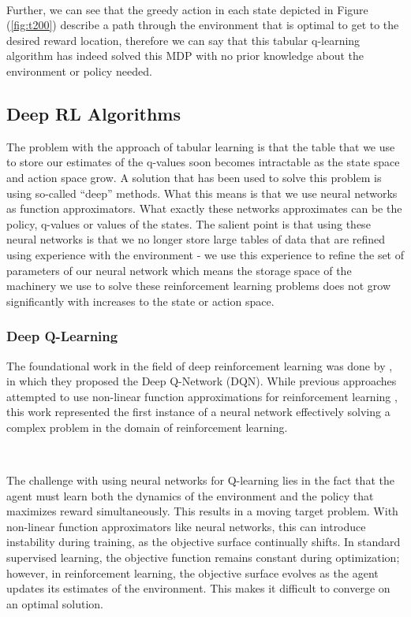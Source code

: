 \documentclass{article}
\begin{document}
\

Further, we can see that the greedy action in each state depicted in Figure (\ref{fig:t200}) describe a path through the environment that is optimal to get to the desired reward location, therefore we can say that this tabular q-learning algorithm has indeed solved this MDP with no prior knowledge about the environment or policy needed.

\subsection{Deep RL Algorithms}\label{sec:deep_rl}


The problem with the approach of tabular learning is that the table that we use to store our estimates of the q-values soon becomes intractable as the state space and action space grow. A solution that has been used to solve this problem is using so-called ``deep'' methods. What this means is that we use neural networks as function approximators. What exactly these networks approximates can be the policy, q-values or values of the states. The salient point is that using these neural networks is that we no longer store large tables of data that are refined using experience with the environment - we use this experience to refine the set of parameters of our neural network which means the storage space of the machinery we use to solve these reinforcement learning problems does not grow significantly with increases to the state or action space.

\subsubsection{Deep Q-Learning}

The foundational work in the field of deep reinforcement learning was done by \citet{mnih2013playing}, in which they proposed the Deep Q-Network (DQN). While previous approaches attempted to use non-linear function approximations for reinforcement learning \citep{tsitsiklis1996temporal}, this work represented the first instance of a neural network effectively solving a complex problem in the domain of reinforcement learning.

\

The challenge with using neural networks for Q-learning lies in the fact that the agent must learn both the dynamics of the environment and the policy that maximizes reward simultaneously. This results in a moving target problem. With non-linear function approximators like neural networks, this can introduce instability during training, as the objective surface continually shifts. In standard supervised learning, the objective function remains constant during optimization; however, in reinforcement learning, the objective surface evolves as the agent updates its estimates of the environment. This makes it difficult to converge on an optimal solution.
\end{document}
